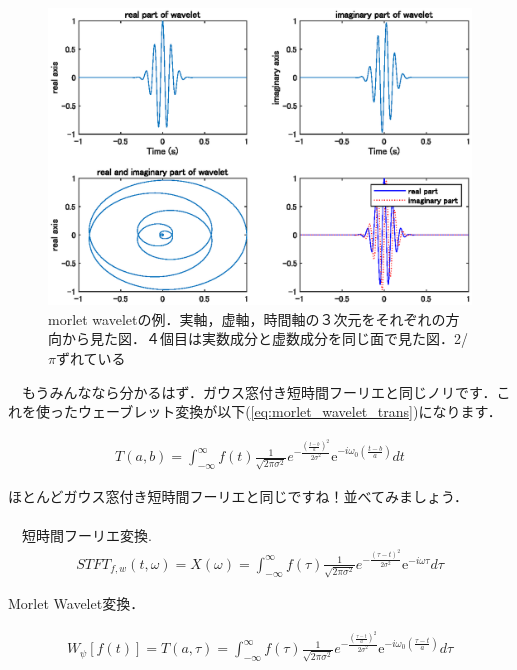\documentclass[11pt,a4paper]{ujreport} 	%
\begin{document}
\begin{figure}[H]
  \centering
  \includegraphics[width=12cm]{../figures/morlet.eps}
  \caption{morlet waveletの例．実軸，虚軸，時間軸の３次元をそれぞれの方向から見た図．４個目は実数成分と虚数成分を同じ面で見た図．2/$\pi$ずれている}
\end{figure}

　もうみんななら分かるはず．ガウス窓付き短時間フーリエと同じノリです．これを使ったウェーブレット変換が以下(\ref{eq:morlet_wavelet_trans})になります．

\begin{eqnarray}
T(a,b) =  \int_{-\infty}^{\infty} f(t) \frac{1}{\sqrt{2\pi\sigma^2}}e^{-\frac{(\frac{t-b}{a})^2}{2\sigma^2}}\mathrm{e}^{-i\omega_0 (\frac{t-b}{a})} dt
\label{eq:morlet_wavelet_trans}
\end{eqnarray}

ほとんどガウス窓付き短時間フーリエと同じですね！並べてみましょう．
\\\\
　短時間フーリエ変換.
\begin{eqnarray}
  STFT_{f,w}(t, \omega) = X(\omega) = \int_{-\infty}^{\infty} f(\tau) \frac{1}{\sqrt{2\pi\sigma^2}}e^{-\frac{{(\tau-t)}^2}{2\sigma^2}}\mathrm{e}^{-i\omega \tau} d\tau
\end{eqnarray}


Morlet Wavelet変換．


\begin{eqnarray}
W_\psi[f(t)] = T(a,\tau) =  \int_{-\infty}^{\infty} f(\tau) \frac{1}{\sqrt{2\pi\sigma^2}}e^{-\frac{(\frac{\tau-t}{a})^2}{2\sigma^2}}\mathrm{e}^{-i\omega_0 (\frac{\tau-t}{a})} d\tau
\end{eqnarray}
\end{document}
